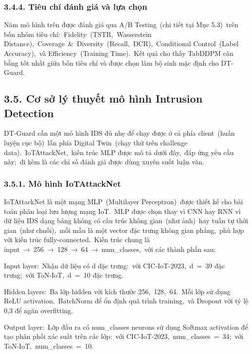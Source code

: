 \subsubsection{3.4.4. Tiêu chí đánh giá và lựa chọn}\label{tiuxeau-chuxed-ux111uxe1nh-giuxe1-vuxe0-lux1ef1a-chux1ecdn}

Năm mô hình trên được đánh giá qua A/B Testing~(chi tiết tại Mục 5.3)~trên bốn nhóm tiêu chí:~Fidelity~(TSTR,~Wasserstein Distance),~Coverage~\&~Diversity~(Recall,~DCR),~Conditional Control~(Label Accuracy),~và Efficiency~(Training Time).~Kết quả cho thấy TabDDPM cân bằng tốt nhất giữa bốn tiêu chí và được chọn làm bộ sinh mặc định cho DT-Guard.

\subsection{3.5. Cơ sở lý thuyết mô hình Intrusion Detection}\label{cux1a1-sux1edf-luxfd-thuyux1ebft-muxf4-huxecnh-intrusion-detection}

DT-Guard cần một mô hình IDS đủ nhẹ để chạy được ở cả phía client~(huấn luyện cục bộ)~lẫn phía Digital Twin~(chạy thử trên challenge data).~IoTAttackNet,~kiến trúc MLP được mô tả dưới đây,~đáp ứng yêu cầu này;~đi kèm là các chỉ số đánh giá được dùng xuyên suốt luận văn.

\subsubsection{3.5.1. Mô hình IoTAttackNet}\label{muxf4-huxecnh-iotattacknet}

IoTAttackNet là một mạng MLP~(Multilayer Perceptron)~được thiết kế cho bài toán phân loại lưu lượng mạng IoT.~MLP được chọn thay vì CNN hay RNN vì dữ liệu IDS dạng bảng không có cấu trúc không gian~(như ảnh)~hay tuần tự thời gian~(như chuỗi),~mỗi mẫu là một vector đặc trưng không gian phẳng,~phù hợp với kiến trúc fully-connected.~Kiến trúc chung là input~→~256~→~128~→~64~→~num\_classes,~với các thành phần sau:

Input layer:~Nhận dữ liệu có d đặc trưng:~với CIC-IoT-2023,~d~=~39 đặc trưng;~với ToN-IoT,~d~=~10 đặc trưng.

Hidden layers:~Ba lớp hidden với kích thước 256,~128,~64.~Mỗi lớp sử dụng ReLU activation,~BatchNorm để ổn định quá trình training,~và Dropout với tỷ lệ 0,3 để ngăn overfitting.

Output layer:~Lớp đầu ra có num\_classes neurons sử dụng Softmax activation để tạo phân phối xác suất trên các lớp:~với CIC-IoT-2023,~num\_classes~=~34;~với ToN-IoT,~num\_classes~=~10.


